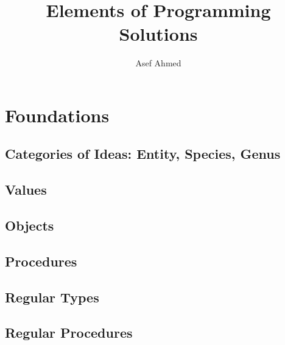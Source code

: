 





\title{Elements of Programming Solutions}

\author{Asef Ahmed}



\maketitle

\section{Foundations}

\subsection{Categories of Ideas: Entity, Species, Genus}
\subsection{Values}

\subsection{Objects}
\subsection{Procedures}
\subsection{Regular Types}

\subsection{Regular Procedures}


    

